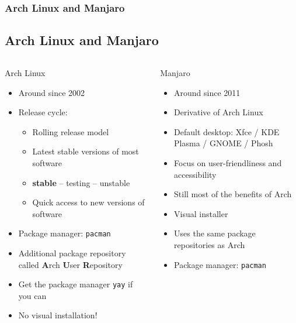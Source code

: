 \begin{frame}
	\frametitle{Arch Linux and Manjaro}
	\subsection{Arch Linux and Manjaro}
	
	\begin{columns}
		\begin{column}[t]{.45\linewidth}
			\begin{block}{Arch Linux}
				\begin{itemize}
					\item Around since 2002
					\item Release cycle:
						\begin{itemize}
							\item Rolling release model
							\item Latest stable versions of most software
							\item \textbf{stable} – testing – unstable
							\item Quick access to new versions of software
						\end{itemize}
					\item Package manager: \texttt{pacman}
					\item Additional package repository called \textbf{A}rch \textbf{U}ser \textbf{R}epository
					\item Get the package manager \texttt{yay} if you can
					\item No visual installation!
				\end{itemize}
			\end{block}
		\end{column}
		\hfill
		\begin{column}[t]{.45\linewidth}
			\begin{block}{Manjaro}
				\begin{itemize}
					\item Around since 2011
					\item Derivative of Arch Linux
					\item Default desktop: Xfce / KDE Plasma / GNOME / Phosh
					\item Focus on user-friendliness and accessibility
					\item Still most of the benefits of Arch
					\item Visual installer
					\item Uses the same package repositories as Arch
					\item Package manager: \texttt{pacman}
				\end{itemize}
			\end{block}
		\end{column}
	\end{columns}
	

\end{frame}
